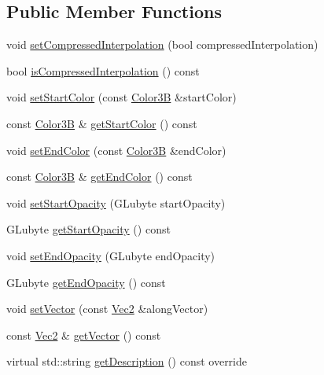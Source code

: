 \subsection*{Public Member Functions}
\begin{DoxyCompactItemize}
\item 
void \hyperlink{classLayerGradient_a2fff019a1124d56ebea72ce4119d5309}{set\+Compressed\+Interpolation} (bool compressed\+Interpolation)
\item 
bool \hyperlink{classLayerGradient_af26407251465e14e789b4d2b5948791a}{is\+Compressed\+Interpolation} () const
\item 
void \hyperlink{classLayerGradient_a80ff3a646b83447f94e617150c560e08}{set\+Start\+Color} (const \hyperlink{structColor3B}{Color3B} \&start\+Color)
\item 
const \hyperlink{structColor3B}{Color3B} \& \hyperlink{classLayerGradient_a3c37fc97948a47c5cdae77e8adeb17e3}{get\+Start\+Color} () const
\item 
void \hyperlink{classLayerGradient_a77846684f7babd57ee10cd96d3f3dd21}{set\+End\+Color} (const \hyperlink{structColor3B}{Color3B} \&end\+Color)
\item 
const \hyperlink{structColor3B}{Color3B} \& \hyperlink{classLayerGradient_ada585e11448c9b1fef49310162d7c600}{get\+End\+Color} () const
\item 
void \hyperlink{classLayerGradient_a435d90e278ecd977feb7f0057572ed1d}{set\+Start\+Opacity} (G\+Lubyte start\+Opacity)
\item 
G\+Lubyte \hyperlink{classLayerGradient_ab1f50492888f24a3a86c8f43f4da7711}{get\+Start\+Opacity} () const
\item 
void \hyperlink{classLayerGradient_ace5db1ce5036e95b70f3038391f74f83}{set\+End\+Opacity} (G\+Lubyte end\+Opacity)
\item 
G\+Lubyte \hyperlink{classLayerGradient_a2045011cab0c21177dcc93408c1e5c23}{get\+End\+Opacity} () const
\item 
void \hyperlink{classLayerGradient_aefd1b00ca1d723c736bdb7a2ff4a802b}{set\+Vector} (const \hyperlink{classVec2}{Vec2} \&along\+Vector)
\item 
const \hyperlink{classVec2}{Vec2} \& \hyperlink{classLayerGradient_aaa3bb25c28ff4f48795cf419a0a9348a}{get\+Vector} () const
\item 
virtual std\+::string \hyperlink{classLayerGradient_a95a281f25e6c4196664e9866e451fcc2}{get\+Description} () const override
\item 
\mbox{\label{classLayerGradient_afb296bb4c8f730a5e754857250188e9c}} 

\end{DoxyCompactItemize}
